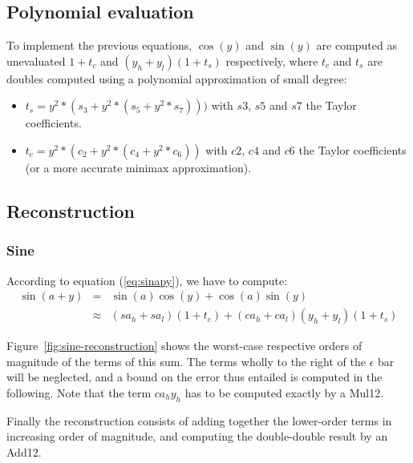 \subsection{Polynomial evaluation}


To implement the previous equations, $\cos(y)$ and $\sin(y)$ are
computed as unevaluated $1+t_c$ and $(y_h+y_l)(1+t_s)$ respectively,
where $t_c$ and $t_s$ are doubles computed using a polynomial
approximation of small degree:

\begin{itemize}
\item $t_s = y^2*(s_3 + y^2*(s_5 + y^2*s_7)))$ with $s3$, $s5$ and
$s7$ the Taylor coefficients.
\item $t_c = y^2*(c_2 + y^2*(c_4 + y^2*c_6))$ with $c2$, $c4$ and $c6$ the
Taylor coefficients (or a more accurate minimax approximation).
\end{itemize}



\subsection{Reconstruction}

\subsubsection{Sine}
According to equation (\ref{eq:sinapy}), we have to compute: 
 \begin{eqnarray*}
  \sin(a+y) &=& \sin(a) \cos(y)  + \cos(a)\sin(y)  \\
  & \approx& (sa_h+sa_l)(1+t_c) + (ca_h+ca_l)(y_h+y_l)(1+t_s)
\end{eqnarray*}


Figure~\ref{fig:sine-reconstruction} shows the worst-case respective
orders of magnitude of the terms of this sum. The terms wholly to the
right of the $\epsilon$ bar will be neglected, and a bound on the
error thus entailed is computed in the following. Note that the term
$ca_hy_h$ has to be computed exactly by a Mul12.

Finally the reconstruction consists of adding together the lower-order
terms in increasing order of magnitude, and computing the
double-double result by an Add12.

